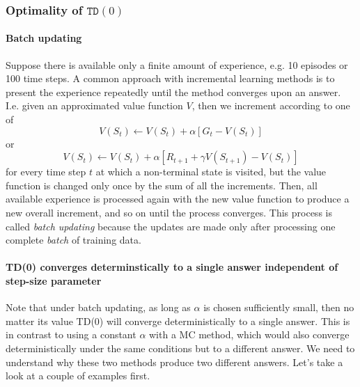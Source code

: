\documentclass[12pt]{article}
\begin{document}
\subsubsection{Optimality of $\texttt{TD}(0)$}
\paragraph{Batch updating} Suppose there is available only a finite amount of experience, e.g. 10 episodes or 100 time steps. A common approach with incremental learning methods is to present the experience repeatedly until the method converges upon an answer. I.e. given an approximated value function $V$, then we increment according to one of
\[
V(S_t) \gets V(S_t) + \alpha \left[G_t - V(S_t)\right]
\]
or
\[
V(S_t) \gets V(S_t) + \alpha \left[R_{t+1} + \gamma V(S_{t+1}) - V(S_t)\right]
\]
for every time step $t$ at which a non-terminal state is visited, but the value function is changed only once by the sum of all the increments. Then, all available experience is processed again with the new value function to produce a new overall increment, and so on until the process converges. This process is called \emph{batch updating} because the updates are made only after processing one complete \emph{batch} of training data.

\paragraph{TD(0) converges determinstically to a single answer independent of   step-size parameter}
Note that under batch updating, as long as $\alpha$ is chosen sufficiently small, then no matter its value TD(0) will converge deterministically to a single answer. This is in contrast to using a constant $\alpha$ with a MC method, which would also converge deterministically under the same conditions but to a different answer. We need to understand why these two methods produce two different answers. Let's take a look at a couple of examples first.
\end{document}
